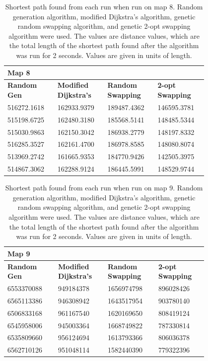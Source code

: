 \documentclass{article}
\begin{document}
\begin{appendices}
\begin{table}[H]
    \caption{Shortest path found from each run when run on map 8. Random generation algorithm, modified Dijkstra's algorithm, genetic random swapping algorithm, and genetic 2-opt swapping algorithm were used. The values are distance values, which are the total length of the shortest path found after the algorithm was run for 2 seconds. Values are given in units of length.}
    \centering
    \begin{tabular}{|p{0.2\linewidth}|p{0.2\linewidth}|p{0.2\linewidth}|p{0.2\linewidth}|}
    \hline
        \textbf{Map 8} & ~ & ~ & ~ \\ \hline
        \textbf{Random Gen} & \textbf{Modified Dijkstra's} & \textbf{Random Swapping} & \textbf{2-opt Swapping} \\ \hline
        516272.1618 & 162933.9379 & 189487.4362 & 146595.3781 \\ \hline
        515198.6725 & 162480.3180 & 185568.5141 & 148485.5344 \\ \hline
        515030.9863 & 162150.3042 & 186938.2779 & 148197.8332 \\ \hline
        516285.3527 & 162161.4700 & 186978.8585 & 148080.8074 \\ \hline
        513969.2742 & 161665.9353 & 184770.9426 & 142505.3975 \\ \hline
        514867.3062 & 162288.9124 & 186445.5991 & 148529.9744 \\ \hline
    \end{tabular}
\end{table}

\begin{table}[H]
    \caption{Shortest path found from each run when run on map 9. Random generation algorithm, modified Dijkstra's algorithm, genetic random swapping algorithm, and genetic 2-opt swapping algorithm were used. The values are distance values, which are the total length of the shortest path found after the algorithm was run for 2 seconds. Values are given in units of length.}
    \centering
    \begin{tabular}{|p{0.2\linewidth}|p{0.2\linewidth}|p{0.2\linewidth}|p{0.2\linewidth}|}
    \hline
        \textbf{Map 9} & ~ & ~ & ~ \\ \hline
        \textbf{Random Gen} & \textbf{Modified Dijkstra's} & \textbf{Random Swapping} & \textbf{2-opt Swapping} \\ \hline
        6553370088 & 949184378 & 1656974798 & 896028426 \\ \hline
        6565113386 & 946308942 & 1643517954 & 903780140 \\ \hline
        6506833168 & 961167540 & 1620169650 & 808419124 \\ \hline
        6545958006 & 945003364 & 1668749822 & 787330814 \\ \hline
        6535809660 & 956124694 & 1613793366 & 806036378 \\ \hline
        6562710126 & 951048114 & 1582440390 & 779322396 \\ \hline
    \end{tabular}
\end{table}


\end{appendices}
\end{document}
